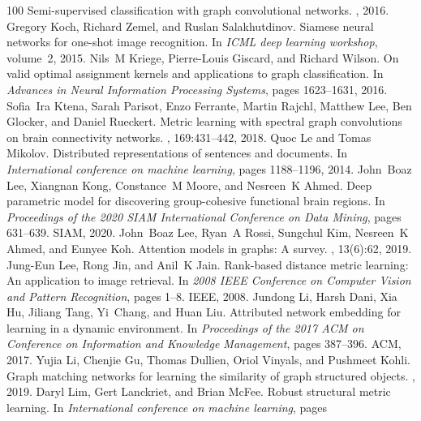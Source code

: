 \begin{thebibliography}{100}
\newblock Semi-supervised classification with graph convolutional networks.
, 2016.
Gregory Koch, Richard Zemel, and Ruslan Salakhutdinov.
\newblock Siamese neural networks for one-shot image recognition.
\newblock In {\em ICML deep learning workshop}, volume~2, 2015.
Nils~M Kriege, Pierre-Louis Giscard, and Richard Wilson.
\newblock On valid optimal assignment kernels and applications to graph
  classification.
\newblock In {\em Advances in Neural Information Processing Systems}, pages
  1623--1631, 2016.
Sofia~Ira Ktena, Sarah Parisot, Enzo Ferrante, Martin Rajchl, Matthew Lee, Ben
  Glocker, and Daniel Rueckert.
\newblock Metric learning with spectral graph convolutions on brain
  connectivity networks.
, 169:431--442, 2018.
Quoc Le and Tomas Mikolov.
\newblock Distributed representations of sentences and documents.
\newblock In {\em International conference on machine learning}, pages
  1188--1196, 2014.
John~Boaz Lee, Xiangnan Kong, Constance~M Moore, and Nesreen~K Ahmed.
\newblock Deep parametric model for discovering group-cohesive functional brain
  regions.
\newblock In {\em Proceedings of the 2020 SIAM International Conference on Data
  Mining}, pages 631--639. SIAM, 2020.
John~Boaz Lee, Ryan~A Rossi, Sungchul Kim, Nesreen~K Ahmed, and Eunyee Koh.
\newblock Attention models in graphs: A survey.
,
  13(6):62, 2019.
Jung-Eun Lee, Rong Jin, and Anil~K Jain.
\newblock Rank-based distance metric learning: An application to image
  retrieval.
\newblock In {\em 2008 IEEE Conference on Computer Vision and Pattern
  Recognition}, pages 1--8. IEEE, 2008.
Jundong Li, Harsh Dani, Xia Hu, Jiliang Tang, Yi~Chang, and Huan Liu.
\newblock Attributed network embedding for learning in a dynamic environment.
\newblock In {\em Proceedings of the 2017 ACM on Conference on Information and
  Knowledge Management}, pages 387--396. ACM, 2017.
Yujia Li, Chenjie Gu, Thomas Dullien, Oriol Vinyals, and Pushmeet Kohli.
\newblock Graph matching networks for learning the similarity of graph
  structured objects.
, 2019.
Daryl Lim, Gert Lanckriet, and Brian McFee.
\newblock Robust structural metric learning.
\newblock In {\em International conference on machine learning}, pages

\end{thebibliography}
